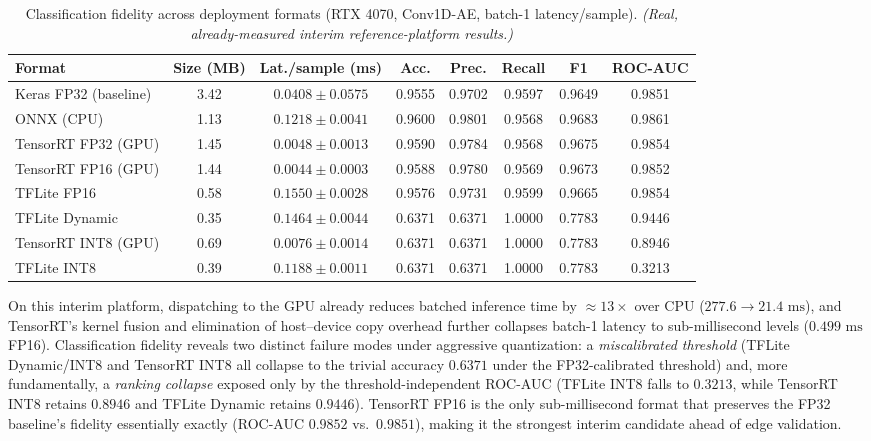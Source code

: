 \documentclass[11pt,a4paper]{article}
\newcommand{\realnote}{{\footnotesize\color{blue!50!black}\textit{(Real, already-measured interim reference-platform results.)}}}
\begin{document}
\begin{table}[ht]
\centering
\small
\caption{Classification fidelity across deployment formats (RTX 4070, Conv1D-AE, batch-1 latency/sample). \realnote}
\label{tab:rtx-fidelity}
\begin{tabular}{@{}lccccccc@{}}
\toprule
Format & Size (MB) & Lat./sample (ms) & Acc. & Prec. & Recall & F1 & ROC-AUC \\
\midrule
Keras FP32 (baseline) & 3.42 & $0.0408\pm0.0575$ & 0.9555 & 0.9702 & 0.9597 & 0.9649 & 0.9851 \\
ONNX (CPU) & 1.13 & $0.1218\pm0.0041$ & 0.9600 & 0.9801 & 0.9568 & 0.9683 & 0.9861 \\
TensorRT FP32 (GPU) & 1.45 & $0.0048\pm0.0013$ & 0.9590 & 0.9784 & 0.9568 & 0.9675 & 0.9854 \\
TensorRT FP16 (GPU) & 1.44 & $0.0044\pm0.0003$ & 0.9588 & 0.9780 & 0.9569 & 0.9673 & 0.9852 \\
TFLite FP16 & 0.58 & $0.1550\pm0.0028$ & 0.9576 & 0.9731 & 0.9599 & 0.9665 & 0.9854 \\
TFLite Dynamic & 0.35 & $0.1464\pm0.0044$ & 0.6371 & 0.6371 & 1.0000 & 0.7783 & 0.9446 \\
TensorRT INT8 (GPU) & 0.69 & $0.0076\pm0.0014$ & 0.6371 & 0.6371 & 1.0000 & 0.7783 & 0.8946 \\
TFLite INT8 & 0.39 & $0.1188\pm0.0011$ & 0.6371 & 0.6371 & 1.0000 & 0.7783 & 0.3213 \\
\bottomrule
\end{tabular}
\end{table}

On this interim platform, dispatching to the GPU already reduces batched inference time
by $\approx 13\times$ over CPU ($277.6\to21.4\text{ ms}$), and TensorRT's kernel fusion
and elimination of host--device copy overhead further collapses batch-1 latency to
sub-millisecond levels ($0.499\text{ ms}$ FP16). Classification fidelity reveals two
distinct failure modes under aggressive quantization: a \emph{miscalibrated threshold}
(TFLite Dynamic/INT8 and TensorRT INT8 all collapse to the trivial accuracy
$0.6371$ under the FP32-calibrated threshold) and, more fundamentally, a
\emph{ranking collapse} exposed only by the threshold-independent ROC-AUC (TFLite INT8
falls to $0.3213$, while TensorRT INT8 retains $0.8946$ and TFLite Dynamic retains
$0.9446$). TensorRT FP16 is the only sub-millisecond format that preserves the FP32
baseline's fidelity essentially exactly (ROC-AUC $0.9852$ vs.\ $0.9851$), making it the
strongest interim candidate ahead of edge validation.
\end{document}
